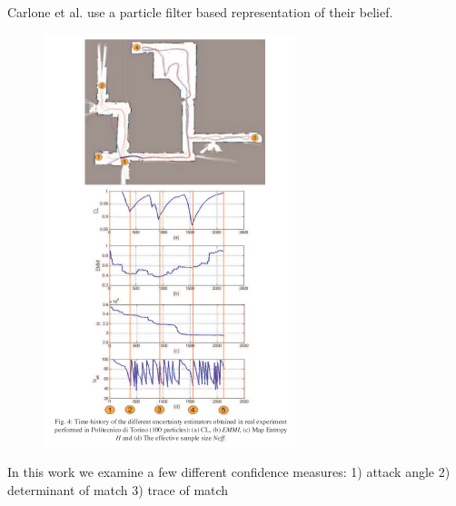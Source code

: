 Carlone et al. use a particle filter based representation of their belief. 

\begin{figure}[ht]
  \begin{center}
    \includegraphics[scale=2]{images/poster_SIDRA2009_result.pdf}
  \end{center}
  \caption{}
  \label{fig:carlone}
\end{figure}

In this work we examine a few different confidence measures:
1) attack angle
2) determinant of match
3) trace of match